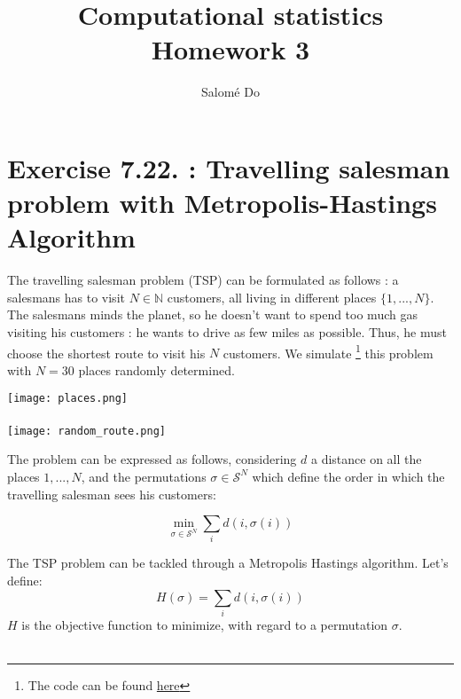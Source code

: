 \documentclass{article}
\begin{document}
    
\thispagestyle{empty}

\title{Computational statistics \\ Homework 3}
\author{Salomé Do}
\maketitle

\section*{Exercise 7.22. : Travelling salesman problem with Metropolis-Hastings Algorithm}



The travelling salesman problem (TSP) can be formulated as follows : 
a salesmans has to visit $N \in \mathbb{N}$ customers, all living 
in different places  $\{ 1, ..., N \}$. The salesmans minds the planet, 
so he doesn't want to spend too much gas visiting his customers : he wants 
to drive as few miles as possible. Thus, he must choose the shortest 
route to visit his $N$ customers. We simulate
 \footnote{The code can be found 
 \href{https://github.com/sally14/ComputationalStats/blob/master/TD3/travelling_saleman.ipynb}{here}
  } this problem with $N=30$ places 
randomly determined.
\begin{center}    
    \begin{multicols}{2}
        \texttt{[image: places.png]} \\ \\
        \texttt{[image: random\_route.png]}
    \end{multicols}
\end{center}

The problem can be expressed as follows, considering $d$ a distance on 
all the places $1, ..., N$, and the permutations $\sigma \in \mathcal{S}^{N}$ 
which define the order in which the travelling salesman sees his customers: 

\[\underset{\sigma \in \mathcal{S}^N}{\min}  \sum_{i} d(i, \sigma(i)) \]


The TSP problem can be tackled through a Metropolis Hastings algorithm.
 Let's define:  \[H(\sigma) = \sum_{i} d(i, \sigma(i))\] 
 $H$ is the objective function to minimize, with regard to a permutation $\sigma$. \\ \\
\end{document}
